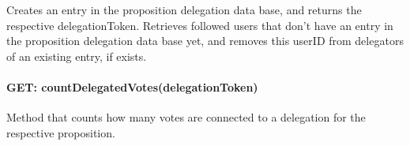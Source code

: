 Creates an entry in the proposition delegation data base, and returns the respective delegationToken. Retrieves followed users that don't have an entry in the proposition delegation data base yet, and removes this userID from delegators of an existing entry, if exists.

\paragraph*{GET: countDelegatedVotes(delegationToken)}

Method that counts how many votes are connected to a delegation for the respective proposition.